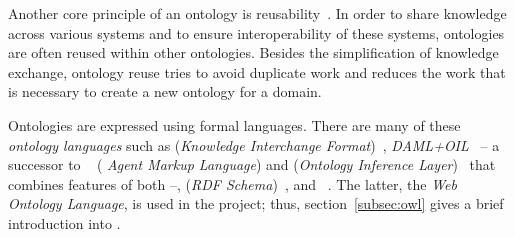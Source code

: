\vspace{1em}

Another core principle of an ontology is reusability~\cite{reuse1,reuse2}. In order to share knowledge across various systems and to ensure interoperability of these systems, ontologies are often reused within other ontologies. Besides the simplification of knowledge exchange, ontology reuse tries to avoid duplicate work and reduces the work that is necessary to create a new ontology for a domain.

\vspace{1em}

Ontologies are expressed using formal languages. There are many of these \emph{ontology languages} such as  (\emph{Knowledge Interchange Format})~\cite{KIFReference}, \emph{DAML+OIL}~\cite{DAML+OIL} -- a successor to ~\cite{DAML} (\emph{ Agent Markup Language}) and  (\emph{Ontology Inference Layer})~\cite{OIL} that combines features of both --,  (\emph{RDF Schema})~\cite{RDFS}, and ~\cite{OWL}. The latter, the \emph{Web Ontology Language}, is used in the \smarthomeweather project; thus, section~\ref{subsec:owl} gives a brief introduction into .

